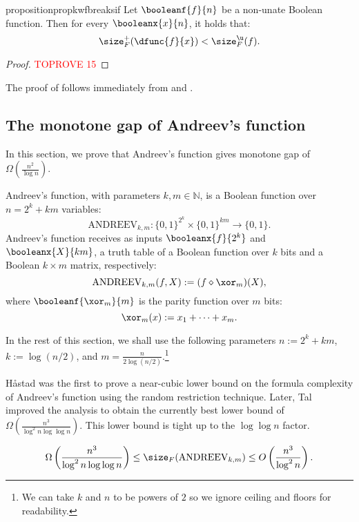 \documentclass[acmsmall, nonacm, authorversion]{acmart}
\begin{document}
\begin{restatable}
{proposition}{propkwfbreaksif}\label{prop:kw-f-breaks-if}
Let $\booleanf{f}{n}$ be a non-unate Boolean function. Then for every $\booleanx{x}{n}$, it holds that:
\[
    \size_{F}^{+}(\dfunc{f}{x}) < \size_{F}^{\u}(f).
\]
\end{restatable}
\begin{proof}\textcolor{red}{TOPROVE 15}\end{proof}

The proof of  follows immediately from  and .

\subsection{The monotone gap of Andreev's function}\label{subsec:andreev}
In this section, we prove that Andreev's function gives monotone gap of $\Omega\left(\frac{n^2}{\log n}\right)$.

\begin{definition}\label{def:andreev-function}
Andreev's function, with parameters $k, m \in \mathbb{N}$, is a Boolean function over $n=2^k+km$ variables:
\[
\text{ANDREEV}_{k,m} : \{0,1\}^{2^k} \times \{0,1\}^{km} \rightarrow \{0,1\}.
\]
Andreev's function receives as inputs $\booleanx{f}{2^k}$ and $\booleanx{X}{km}$, a truth table of a Boolean function over $k$ bits and a Boolean $k\times m$ matrix, respectively: 
\[
\text{ANDREEV}_{k,m}(f, X) := (f \diamond \xor_m)(X),
\]
where $\booleanf{\xor_m}{m}$ is the parity function over $m$ bits:
\[
\xor_m(x):=x_1+\dots+x_m.
\]
\end{definition}

In the rest of this section, we shall use the following parameters $n:=2^k+km$, 
$k:=\log(n/2)$, and $m=\frac{n}{2\log(n/2)}$.\footnote{We can take $k$ and $n$ to be powers of $2$ so we ignore ceiling and floors for readability.} 

H{\aa}stad was the first to prove a near-cubic lower bound on the formula complexity of Andreev's function \cite{Has98} using the random restriction technique. Later, Tal \cite{Tal14} improved the analysis to obtain the currently best lower bound of $\Omega\left(\frac{n^3}{\log^2n\log\log n}\right)$. This lower bound is tight up to the $\log \log n$ factor.

\begin{theorem}\label{thm:andreev-lower-bound}
\[
\Omega\left(\frac{n^3}{\log^2n\log\log n}\right)\le \size_F(\text{ANDREEV}_{k,m})\leq O\left(\frac{n^3}{\log^2n}\right).
\]
\end{theorem}
\end{document}
